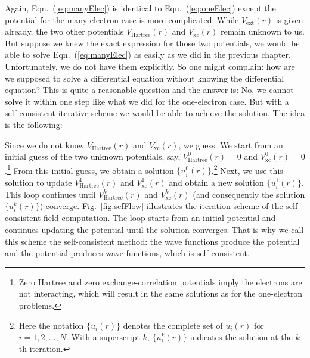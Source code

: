 Again, Eqn.~(\ref{eq:manyElec}) is identical to Eqn.~(\ref{eq:oneElec}) except
the potential for the many-electron case is more complicated. While $V_{\text{ext}}(r)$
is given already, the two other potentials $V_{\text{Hartree}}(r)$ and $V_{\text{xc}}(r)$
remain unknown to us. But suppose we knew the exact expression for those
two potentials, we would be able to solve Eqn.~(\ref{eq:manyElec}) as
easily as we did in the previous chapter. Unfortunately, we do not have them
explicitly. So one might complain: how are we supposed to solve a differential
equation without knowing the differential equation? This is quite a reasonable
question and the answer is: No, we cannot solve it within one step like what we did for
the one-electron case. But with a self-consistent iterative scheme we would be able to
achieve the solution. The idea is the following:

Since we do not know $V_{\text{Hartree}}(r)$ and $V_{\text{xc}}(r)$, we guess.
We start from an initial guess of the two unknown potentials,
say, $V_{\text{Hartree}}^0(r)=0$ and $V_{\text{xc}}^0(r)=0$.\footnote{Zero
Hartree and zero exchange-correlation potentials imply the
electrons are not interacting, which will result in the same solutions as for the
one-electron problems.}
From this initial guess, we obtain a solution $\{u_i^0(r)\}$.\footnote{Here
the notation $\{u_i(r)\}$ denotes the complete set of
$u_i(r)$ for $i=1,2,\ldots,N$. With a superscript $k$, $\{u_i^k(r)\}$ indicates
the solution at the $k$-th iteration.}
Next, we use this solution to update $V_{\text{Hartree}}^1(r)$ and $V_{\text{xc}}^1(r)$
and obtain a new solution $\{u_i^1(r)\}$. This loop continues until $V_{\text{Hartree}}^k(r)$
and $V_{\text{xc}}^k(r)$ (and consequently the solution $\{u_i^k(r)\}$) converge.
Fig.~\ref{fig:scfFlow} illustrates the iteration scheme of the self-consistent field
computation. The loop starts from an initial potential and continues updating the
potential until the solution converges. That is why we call this scheme the self-consistent
method: the wave functions produce the potential and the potential produces wave functions,
which is self-consistent.

